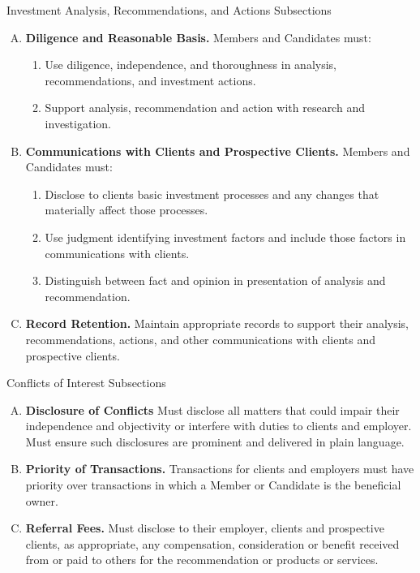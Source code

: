 \documentclass[../custom,grid]{flashcards}
\begin{document}
\begin{flashcard}{Investment Analysis, Recommendations, and Actions Subsections}
    \begin{enumerate}[A.]
        \item \textbf{Diligence and Reasonable Basis.} Members and Candidates must:
            \begin{enumerate}[1.]
                \item Use diligence, independence, and thoroughness in analysis, recommendations, and investment actions.
                \item Support analysis, recommendation and action with research and investigation.
            \end{enumerate}
        \item \textbf{Communications with Clients and Prospective Clients.} Members and Candidates must:
            \begin{enumerate}[1.]
                \item Disclose to clients basic investment processes and any changes that materially affect those processes.
                \item Use judgment identifying investment factors and include those factors in communications with clients.
                \item Distinguish between fact and opinion in presentation of analysis and recommendation.
            \end{enumerate}
        \item \textbf{Record Retention.} Maintain appropriate records to support their analysis, recommendations, actions, and other communications with clients and prospective clients.
    \end{enumerate}
\end{flashcard}

\begin{flashcard}{Conflicts of Interest Subsections}
    \begin{enumerate}[A.]
        \item \textbf{Disclosure of Conflicts} Must disclose all matters that could impair their independence and objectivity or interfere with duties to clients and employer. Must ensure such disclosures are prominent and delivered in plain language.
        \item \textbf{Priority of Transactions.} Transactions for clients and employers must have priority over transactions in which a Member or Candidate is the beneficial owner.
        \item \textbf{Referral Fees.} Must disclose to their employer, clients and prospective clients, as appropriate, any compensation, consideration or benefit received from or paid to others for the recommendation or products or services.
    \end{enumerate}
\end{flashcard}
\end{document}
